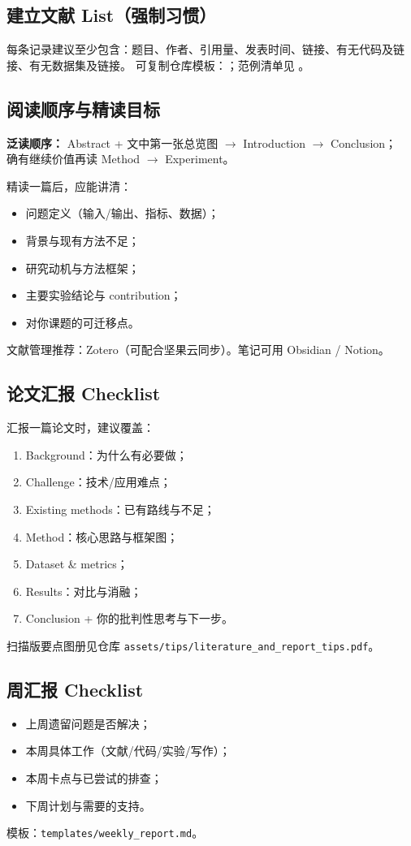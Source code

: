 \subsection{建立文献 List（强制习惯）}
每条记录建议至少包含：题目、作者、引用量、发表时间、链接、有无代码及链接、有无数据集及链接。
可复制仓库模板：；范例清单见 。

\subsection{阅读顺序与精读目标}
\textbf{泛读顺序：} Abstract + 文中第一张总览图 $\rightarrow$ Introduction $\rightarrow$ Conclusion；\\
确有继续价值再读 Method $\rightarrow$ Experiment。

精读一篇后，应能讲清：
\begin{itemize}
  \item 问题定义（输入/输出、指标、数据）；
  \item 背景与现有方法不足；
  \item 研究动机与方法框架；
  \item 主要实验结论与 contribution；
  \item 对你课题的可迁移点。
\end{itemize}

文献管理推荐：Zotero（可配合坚果云同步）。笔记可用 Obsidian / Notion。

\subsection{论文汇报 Checklist}
汇报一篇论文时，建议覆盖：
\begin{enumerate}
  \item Background：为什么有必要做；
  \item Challenge：技术/应用难点；
  \item Existing methods：已有路线与不足；
  \item Method：核心思路与框架图；
  \item Dataset \& metrics；
  \item Results：对比与消融；
  \item Conclusion + 你的批判性思考与下一步。
\end{enumerate}
扫描版要点图册见仓库 \texttt{assets/tips/literature\_and\_report\_tips.pdf}。

\subsection{周汇报 Checklist}
\begin{itemize}
  \item 上周遗留问题是否解决；
  \item 本周具体工作（文献/代码/实验/写作）；
  \item 本周卡点与已尝试的排查；
  \item 下周计划与需要的支持。
\end{itemize}
模板：\texttt{templates/weekly\_report.md}。
